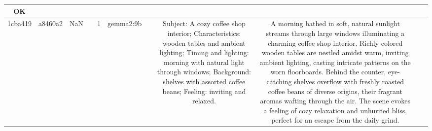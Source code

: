 \begin{table}[h!]
\begin{tabular}{|c|c|c|c|c|c|c|c|c|c|c|}
OK\\
\hline
1cba419 & a8460a2 & NaN &  & 1 & gemma2:9b &  & Subject: A cozy coffee shop interior; Characteristics: wooden tables and ambient lighting; Timing and lighting: morning with natural light through windows; Background: shelves with assorted coffee beans; Feeling: inviting and relaxed. & A morning bathed in soft, natural sunlight streams through large windows illuminating a charming coffee shop interior. Richly colored wooden tables are nestled amidst warm, inviting ambient lighting, casting intricate patterns on the worn floorboards.  Behind the counter, eye-catching shelves overflow with freshly roasted coffee beans of diverse origins, their fragrant aromas wafting through the air. The scene evokes a feeling of cozy relaxation and unhurried bliss, perfect for an escape from the daily grind. 



\end{tabular}
\end{table}
